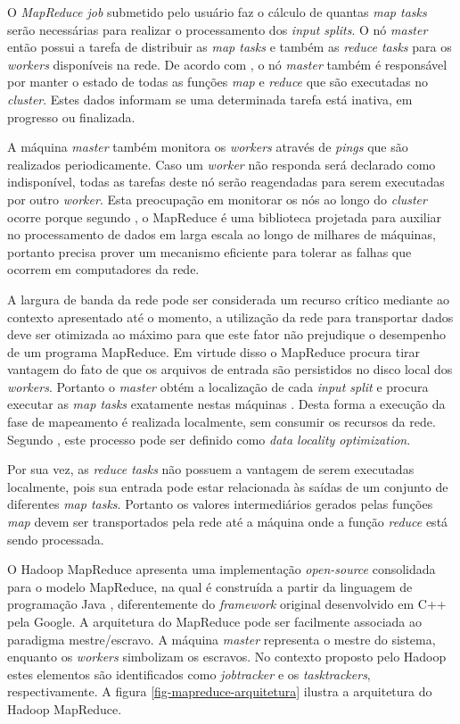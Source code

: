 O \textit{MapReduce job} submetido pelo usuário faz o cálculo de quantas \textit{map tasks} serão necessárias para realizar o processamento dos \textit{input splits}. O nó \textit{master} então possui a tarefa de distribuir as \textit{map tasks} e também as \textit{reduce tasks} para os \textit{workers} disponíveis na rede. De acordo com , o nó \textit{master} também é responsável por manter o estado de todas as funções \textit{map} e \textit{reduce} que são executadas no \textit{cluster}. Estes dados informam se uma determinada tarefa está inativa, em progresso ou finalizada. 

A máquina \textit{master} também monitora os \textit{workers} através de \textit{pings} que são realizados periodicamente. Caso um \textit{worker} não responda será declarado como indisponível, todas as tarefas deste nó serão reagendadas para serem executadas por outro \textit{worker}. Esta preocupação em monitorar os nós ao longo do \textit{cluster} ocorre porque segundo , o MapReduce é uma biblioteca projetada para auxiliar no processamento de dados em larga escala ao longo de milhares de máquinas, portanto precisa prover um mecanismo eficiente para tolerar as falhas que ocorrem em computadores da rede.

A largura de banda da rede pode ser considerada um recurso crítico mediante ao contexto apresentado até o momento, a utilização da rede para transportar dados deve ser otimizada ao máximo para que este fator não prejudique o desempenho de um programa MapReduce. Em virtude disso o MapReduce procura tirar vantagem do fato de que os arquivos de entrada são persistidos no disco local dos \textit{workers}. Portanto o \textit{master} obtém a localização de cada \textit{input split} e procura executar as \textit{map tasks} exatamente nestas máquinas \cite{ghemawatMapreduce2008}. Desta forma a execução da fase de mapeamento é realizada localmente, sem consumir os recursos da rede. Segundo , este processo pode ser definido como \textit{data locality optimization}.

Por sua vez, as \textit{reduce tasks} não possuem a vantagem de serem executadas localmente, pois sua entrada pode estar relacionada às saídas de um conjunto de diferentes \textit{map tasks}. Portanto os valores intermediários gerados pelas funções \textit{map} devem ser transportados pela rede até a máquina onde a função \textit{reduce} está sendo processada.

O Hadoop MapReduce apresenta uma implementação \textit{open-source} consolidada para o modelo MapReduce, na qual é construída a partir da linguagem de programação Java \cite{hadoopSiteMapReduce}, diferentemente do \textit{framework} original desenvolvido em C++ pela Google. A arquitetura do MapReduce pode ser facilmente associada ao paradigma mestre/escravo. A máquina \textit{master} representa o mestre do sistema, enquanto os \textit{workers} simbolizam os escravos. No contexto proposto pelo Hadoop estes elementos são identificados como \textit{jobtracker} e os \textit{tasktrackers}, respectivamente. A figura \ref{fig-mapreduce-arquitetura} ilustra a arquitetura do Hadoop MapReduce.

